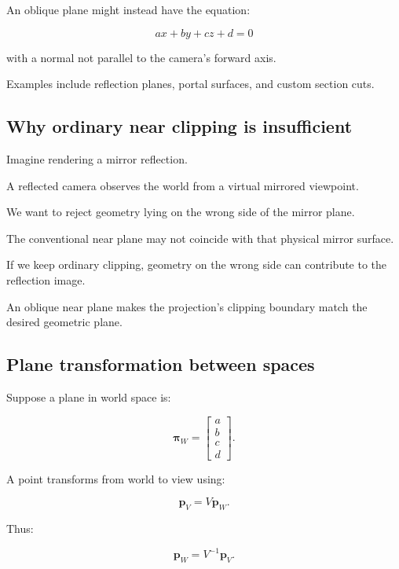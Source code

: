 An oblique plane might instead have the equation:

\[
 \boxed{ ax+by+cz+d=0 }
\]

with a normal not parallel to the camera's forward axis.

Examples include reflection planes, portal surfaces, and custom section cuts.

\subsection{Why ordinary near clipping is insufficient}\label{02-foundations-ii-ch034-why-ordinary-near-clipping-is-insufficient}

\hypertarget{02-foundations-ii-ch034-why-ordinary-near-clipping-is-insufficient}{}

Imagine rendering a mirror reflection.

A reflected camera observes the world from a virtual mirrored viewpoint.

We want to reject geometry lying on the wrong side of the mirror plane.

The conventional near plane may not coincide with that physical mirror surface.

If we keep ordinary clipping, geometry on the wrong side can contribute to the reflection image.

An oblique near plane makes the projection's clipping boundary match the desired geometric plane.

\subsection{Plane transformation between spaces}\label{02-foundations-ii-ch034-plane-transformation-between-spaces}

\hypertarget{02-foundations-ii-ch034-plane-transformation-between-spaces}{}

Suppose a plane in world space is:

\[
 \boldsymbol\pi_W= \begin{bmatrix} a\\b\\c\\d \end{bmatrix}.
\]

A point transforms from world to view using:

\[
 \mathbf p_V=V\mathbf p_W.
\]

Thus:

\[
 \mathbf p_W=V^{-1}\mathbf p_V.
\]

